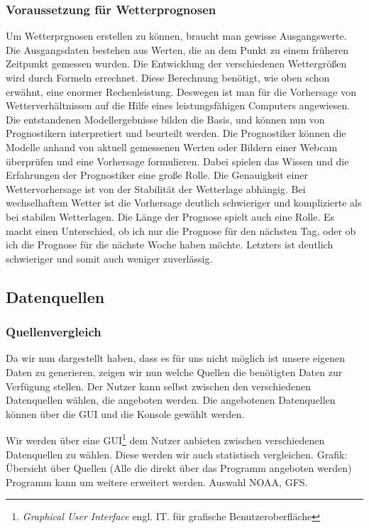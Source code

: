\subsubsection{Voraussetzung für Wetterprognosen} %
Um Wetterprgnosen erstellen zu können, braucht man gewisse Ausgangswerte. Die Ausgangsdaten bestehen aus Werten, die an dem Punkt zu einem früheren Zeitpunkt gemessen wurden. Die Entwicklung der verschiedenen Wettergrößen wird durch Formeln errechnet. Diese Berechnung benötigt, wie oben schon erwähnt, eine enormer Rechenleistung. Deswegen ist man für die Vorhersage von Wetterverhältnissen auf die Hilfe eines leistungsfähigen Computers angewiesen.
Die entstandenen Modellergebnisse bilden die Basis, und können nun von Prognostikern interpretiert und beurteilt werden. Die Prognostiker können die Modelle anhand von aktuell gemessenen Werten oder Bildern einer Webcam überprüfen und eine Vorhersage formulieren. Dabei spielen das Wissen und die Erfahrungen der Prognostiker eine große Rolle. 
Die Genauigkeit einer Wettervorhersage ist von der Stabilität der Wetterlage abhängig. Bei wechselhaftem Wetter ist die Vorhersage deutlich schwieriger und komplizierte als bei stabilen Wetterlagen. Die Länge der Prognose spielt auch eine Rolle. Es macht einen Unterschied, ob ich nur die Prognose für den nächsten Tag, oder ob ich die Prognose für die nächste Woche haben möchte. Letzters ist deutlich schwieriger und somit auch weniger zuverlässig.

\subsection{Datenquellen} %

\subsubsection{Quellenvergleich} %
Da wir nun dargestellt haben, dass es für uns nicht möglich ist unsere eigenen Daten zu generieren, zeigen wir nun welche Quellen die benötigten Daten zur Verfügung stellen.
Der Nutzer kann selbst zwischen den verschiedenen Datenquellen wählen, die angeboten werden.
Die angebotenen Datenquellen können über die GUI und die Konsole gewählt werden.

Wir werden über eine GUI\footnote{\textit{Graphical User Interface} engl. IT. für grafische Benutzeroberfläche} dem Nutzer anbieten zwischen verschiedenen Datenquellen zu wählen.
Diese werden wir auch statistisch vergleichen.
Grafik: Übersicht über Quellen (Alle die direkt über das Programm angeboten werden)
Programm kann um weitere erweitert werden.
Auswahl NOAA, GFS.\cite{noaa}


